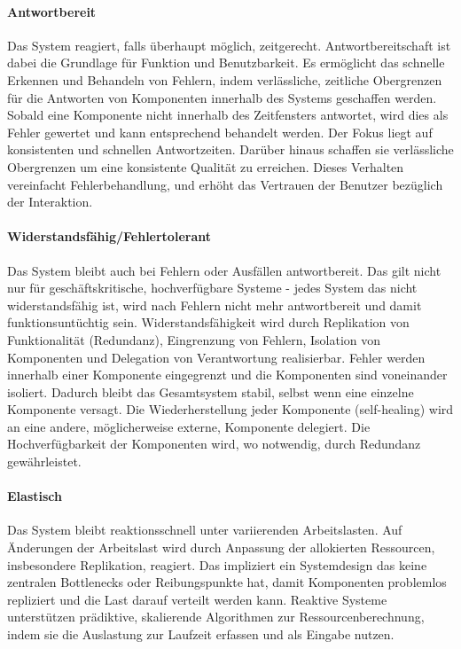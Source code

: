 \paragraph{Antwortbereit}Das System reagiert, falls überhaupt möglich, zeitgerecht. Antwortbereitschaft ist dabei die Grundlage für Funktion und
Benutzbarkeit. Es ermöglicht das schnelle Erkennen und Behandeln von Fehlern, indem verlässliche, zeitliche Obergrenzen für die Antworten von
Komponenten innerhalb des Systems geschaffen werden. Sobald eine Komponente nicht innerhalb des Zeitfensters antwortet, wird dies als Fehler gewertet und kann
entsprechend behandelt werden.
Der Fokus liegt auf konsistenten und schnellen Antwortzeiten. Darüber hinaus schaffen sie
verlässliche Obergrenzen um eine konsistente Qualität zu erreichen.
Dieses Verhalten vereinfacht Fehlerbehandlung, und erhöht das Vertrauen der Benutzer bezüglich der Interaktion.

\paragraph{Widerstandsfähig/Fehlertolerant}Das System bleibt auch bei Fehlern oder Ausfällen antwortbereit.
Das gilt nicht nur für geschäftskritische, hochverfügbare Systeme -
jedes System das nicht widerstandsfähig ist, wird nach Fehlern nicht mehr antwortbereit und damit funktionsuntüchtig sein.
Widerstandsfähigkeit wird durch Replikation von Funktionalität (Redundanz), Eingrenzung von Fehlern, Isolation von Komponenten und
Delegation von Verantwortung realisierbar.
Fehler werden innerhalb einer Komponente eingegrenzt und die Komponenten sind voneinander isoliert. Dadurch bleibt das Gesamtsystem stabil, selbst
wenn eine einzelne Komponente versagt.
Die Wiederherstellung jeder Komponente (self-healing) wird an eine andere, möglicherweise externe, Komponente delegiert.
Die Hochverfügbarkeit der Komponenten wird, wo notwendig, durch Redundanz gewährleistet.

\paragraph{Elastisch}Das System bleibt reaktionsschnell unter variierenden Arbeitslasten. Auf Änderungen der Arbeitslast wird durch
Anpassung der allokierten Ressourcen, insbesondere Replikation, reagiert. Das impliziert ein Systemdesign das keine zentralen Bottlenecks oder
Reibungspunkte hat, damit Komponenten problemlos repliziert und die Last darauf verteilt werden kann.
Reaktive Systeme unterstützen prädiktive, skalierende Algorithmen zur Ressourcenberechnung,
indem sie die Auslastung zur Laufzeit erfassen und als Eingabe nutzen.

